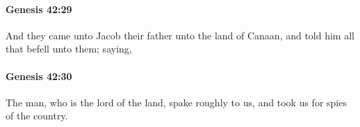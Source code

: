 		\paragraph{Genesis 42:29} %
			\label{GENESIS-42-29}

			And they came unto Jacob their father unto the land of Canaan, and told him all that befell unto them; saying,


		\paragraph{Genesis 42:30} %
			\label{GENESIS-42-30}

			The man, who is the lord of the land, spake roughly to us, and took us for spies of the country.


